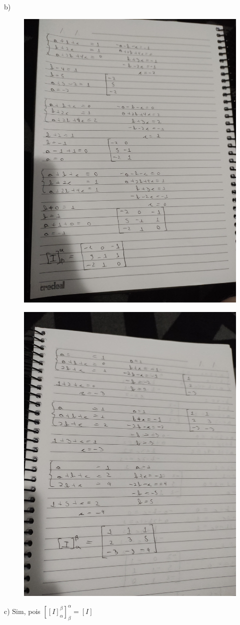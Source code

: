 \documentclass[12pt]{article}
\begin{document}
b)\\
\begin{figure}[h!]
	\includegraphics[scale=0.12]{q5a}
\end{figure}
\begin{figure}[h!]
	\includegraphics[scale=0.12]{q5b}
\end{figure}
c) Sim, pois $\displaystyle[[I]^{\beta}_{\alpha}]^{\alpha}_{\beta} = [I]$\\
\end{document}
